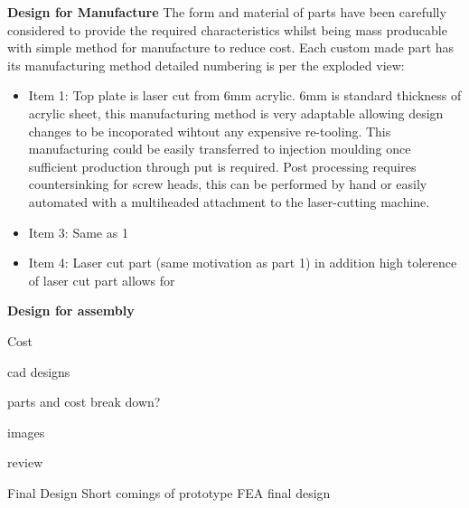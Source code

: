 
\textbf{Design for Manufacture}
The form and material of parts have been carefully considered to provide the required characteristics whilst being mass producable with simple method for manufacture to reduce cost. Each custom made part has its manufacturing method detailed numbering is per the exploded view:
\begin{itemize}
\item Item 1: Top plate is laser cut from 6mm acrylic. 6mm is standard thickness of acrylic sheet, this manufacturing method is very adaptable allowing design changes to be incoporated wihtout any expensive re-tooling. This manufacturing could be easily transferred to injection moulding once sufficient production through put is required. Post processing requires countersinking for screw heads, this can be performed by hand or easily automated with a multiheaded attachment to the laser-cutting machine.
\item Item 3: Same as 1
\item Item 4: Laser cut part (same motivation as part 1) in addition high tolerence of laser cut part allows for 
\end{itemize}

\textbf{Design for assembly}



Cost



cad designs

parts and cost break down?

images

review


Final Design
Short comings of prototype FEA
final design

